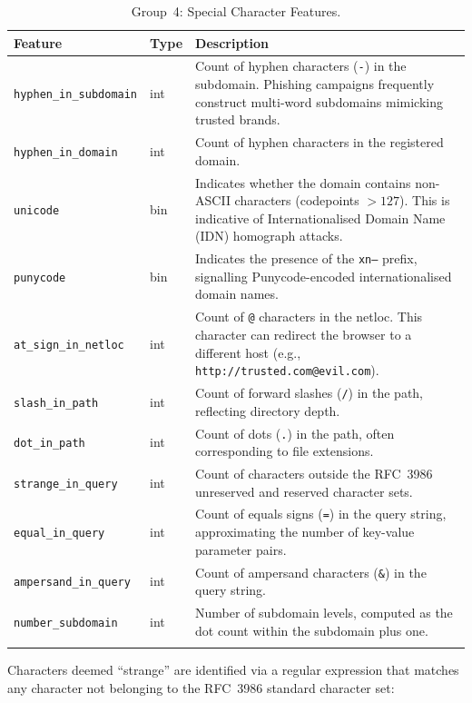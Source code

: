 \documentclass[a4paper,12pt]{article}
\begin{document}
\begin{longtable}{p{5.2cm}p{1.3cm}p{6.5cm}}
\toprule
\textbf{Feature} & \textbf{Type} & \textbf{Description} \\
\midrule
\endhead
\texttt{hyphen\_in\_subdomain} & int & Count of hyphen characters (\texttt{-}) in the subdomain. Phishing campaigns frequently construct multi-word subdomains mimicking trusted brands. \\
\texttt{hyphen\_in\_domain}    & int & Count of hyphen characters in the registered domain. \\
\texttt{unicode}               & bin & Indicates whether the domain contains non-ASCII characters (codepoints $> 127$). This is indicative of Internationalised Domain Name (IDN) homograph attacks. \\
\texttt{punycode}              & bin & Indicates the presence of the \texttt{xn--} prefix, signalling Punycode-encoded internationalised domain names. \\
\texttt{at\_sign\_in\_netloc}  & int & Count of \texttt{@} characters in the netloc. This character can redirect the browser to a different host (e.g., \texttt{http://trusted.com@evil.com}). \\
\texttt{slash\_in\_path}       & int & Count of forward slashes (\texttt{/}) in the path, reflecting directory depth. \\
\texttt{dot\_in\_path}         & int & Count of dots (\texttt{.}) in the path, often corresponding to file extensions. \\
\texttt{strange\_in\_query}    & int & Count of characters outside the RFC~3986 unreserved and reserved character sets. \\
\texttt{equal\_in\_query}      & int & Count of equals signs (\texttt{=}) in the query string, approximating the number of key-value parameter pairs. \\
\texttt{ampersand\_in\_query}  & int & Count of ampersand characters (\texttt{\&}) in the query string. \\
\texttt{number\_subdomain}     & int & Number of subdomain levels, computed as the dot count within the subdomain plus one. \\
\bottomrule
\caption{Group~4: Special Character Features.}
\label{tab:special_char}
\end{longtable}

Characters deemed ``strange'' are identified via a regular expression that matches any character not belonging to the RFC~3986 standard character set:
\end{document}
